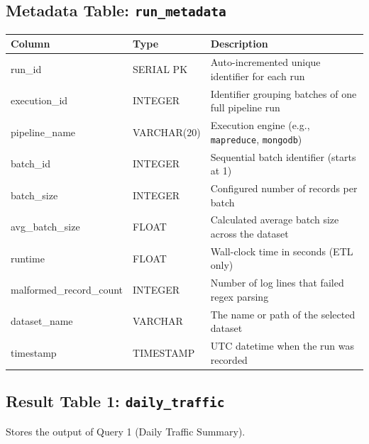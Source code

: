\documentclass[11pt,a4paper]{article}
\begin{document}
\subsection{Metadata Table: \texttt{run\_metadata}}

\begin{schematable}
\begin{tabularx}{\linewidth}{@{} >{\ttfamily\small}l >{\small}l X @{}}
\toprule
\textnormal{\textbf{Column}} & \textbf{Type} & \textbf{Description} \\
\midrule
run\_id              & SERIAL PK    & Auto-incremented unique identifier for each run \\
execution\_id        & INTEGER      & Identifier grouping batches of one full pipeline run \\
pipeline\_name       & VARCHAR(20)  & Execution engine (e.g., \texttt{mapreduce}, \texttt{mongodb}) \\
batch\_id            & INTEGER      & Sequential batch identifier (starts at 1) \\
batch\_size          & INTEGER      & Configured number of records per batch \\
avg\_batch\_size     & FLOAT        & Calculated average batch size across the dataset \\
runtime              & FLOAT        & Wall-clock time in seconds (ETL only) \\
malformed\_record\_count & INTEGER  & Number of log lines that failed regex parsing \\
dataset\_name        & VARCHAR      & The name or path of the selected dataset \\
timestamp            & TIMESTAMP    & UTC datetime when the run was recorded \\
\bottomrule
\end{tabularx}
\end{schematable}

\subsection{Result Table 1: \texttt{daily\_traffic}}

Stores the output of Query 1 (Daily Traffic Summary).
\end{document}
